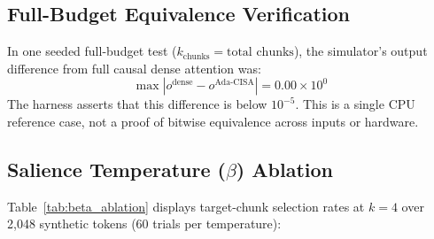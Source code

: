 \documentclass[10pt,twocolumn]{article}
\begin{document}
\subsection{Full-Budget Equivalence Verification}
In one seeded full-budget test ($k_{\text{chunks}} = \text{total chunks}$), the simulator's output difference from full causal dense attention was:
\begin{equation}
\max |o^{\text{dense}} - o^{\text{Ada-CISA}}| = 0.00 \times 10^0
\end{equation}
The harness asserts that this difference is below $10^{-5}$. This is a single CPU reference case, not a proof of bitwise equivalence across inputs or hardware.

\subsection{Salience Temperature ($\beta$) Ablation}
Table~\ref{tab:beta_ablation} displays target-chunk selection rates at $k=4$ over 2,048 synthetic tokens (60 trials per temperature):
\begin{table}[h]
\centering
\small
\caption{Synthetic needle-chunk selection by temperature ($N=2048$, 60 trials per cell, $k=4$).}
\label{tab:beta_ablation}
\end{table}
\end{document}
